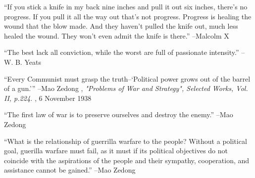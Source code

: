 \documentclass{article}%
\begin{document}
\vspace{1mm}%
\begin{minipage}{\textwidth}%
\flushleft%
“If you stick a knife in my back nine inches and pull it out six inches, there's no progress. If you pull it all the way out that's not progress. Progress is healing the wound that the blow made. And they haven't pulled the knife out, much less healed the wound. They won't even admit the knife is there.”%
\linebreak%
\vspace{1mm}%
–Malcolm X%
\linebreak%
\vspace{1mm}%
\end{minipage}%
\linebreak%
\vspace{1mm}%
\begin{minipage}{\textwidth}%
\flushleft%
“The best lack all conviction, while the worst are full of passionate intensity.”%
\linebreak%
\vspace{1mm}%
–W. B. Yeats%
\linebreak%
\vspace{1mm}%
\end{minipage}%
\linebreak%
\vspace{1mm}%
\begin{minipage}{\textwidth}%
\flushleft%
“Every Communist must grasp the truth–‘Political power grows out of the barrel of a gun.’”%
\linebreak%
\vspace{1mm}%
–Mao Zedong%
, \textit{"Problems of War and Strategy", Selected Works, Vol. II, p.224.}%
, 6 November 1938%
\linebreak%
\vspace{1mm}%
\end{minipage}%
\linebreak%
\vspace{1mm}%
\begin{minipage}{\textwidth}%
\flushleft%
“The first law of war is to preserve ourselves and destroy the enemy.”%
\linebreak%
\vspace{1mm}%
–Mao Zedong%
\linebreak%
\vspace{1mm}%
\end{minipage}%
\linebreak%
\vspace{1mm}%
\begin{minipage}{\textwidth}%
\flushleft%
“What is the relationship of guerrilla warfare to the people? Without a political goal, guerilla warfare must fail, as it must if its political objectives do not coincide with the aspirations of the people and their sympathy, cooperation, and assistance cannot be gained.”%
\linebreak%
\vspace{1mm}%
–Mao Zedong%
\linebreak%
\vspace{1mm}%
\end{minipage}%
\end{document}
